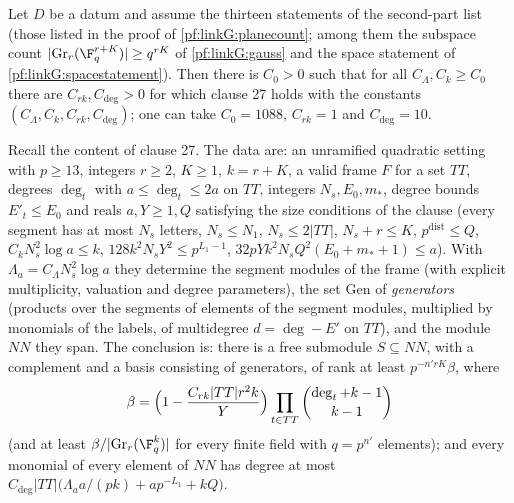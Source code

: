 \begin{theorem}\label{pf:linkG:secondpart}
Let $D$ be a datum and assume the thirteen statements of the second-part list (those listed in the proof of
\cref{pf:linkG:planecount}; among them the subspace count $|\mathrm{Gr}_r(\F_q^{r+K})|\ge q^{rK}$ of \cref{pf:linkG:gauss} and the
space statement of \cref{pf:linkG:spacestatement}). Then there is $C_0>0$ such that for all $C_\Lambda,C_k\ge C_0$ there are
$C_{rk},C_{\deg}>0$ for which clause 27 holds with the constants $(C_\Lambda,C_k,C_{rk},C_{\deg})$; one can take $C_0=1088$,
$C_{rk}=1$ and $C_{\deg}=10$.
\end{theorem}

Recall the content of clause 27. The data are: an unramified quadratic setting with $p\ge13$, integers $r\ge2$, $K\ge1$,
$k=r+K$, a valid frame $F$ for a set $TT$, degrees $\deg_t$ with $a\le\deg_t\le2a$ on $TT$, integers $N_s,E_0,m_*$, degree
bounds $E'_t\le E_0$ and reals $a,Y\ge1,Q$ satisfying the size conditions of the clause (every segment has at most $N_s$
letters, $N_s\le N_1$, $N_s\le2|TT|$, $N_s+r\le K$, $p^{\mathrm{dist}}\le Q$, $C_kN_s^2\log a\le k$, $128k^2N_sY^2\le
p^{L_1-1}$, $32pYk^2N_sQ^2(E_0+m_*+1)\le a$). With $\Lambda_a=C_\Lambda N_s^2\log a$ they determine the segment modules of the
frame (with explicit multiplicity, valuation and degree parameters), the set $\mathrm{Gen}$ of \emph{generators} (products over
the segments of elements of the segment modules, multiplied by monomials of the labels, of multidegree
$d=\deg-E'$ on $TT$), and the module $NN$ they span. The conclusion is: there is a free submodule $S\subseteq NN$, with a
complement and a basis consisting of generators, of rank at least $p^{-n'rK}\beta$, where
\[
\beta=\Bigl(1-\frac{C_{rk}|TT|r^2k}{Y}\Bigr)\prod_{t\in TT}\binom{\deg_t+k-1}{k-1}
\]
(and at least $\beta/|\mathrm{Gr}_r(\F_q^k)|$ for every finite field with $q=p^{n'}$ elements); and every monomial of every
element of $NN$ has degree at most $C_{\deg}|TT|\bigl(\Lambda_aa/(pk)+ap^{-L_1}+kQ\bigr)$.

